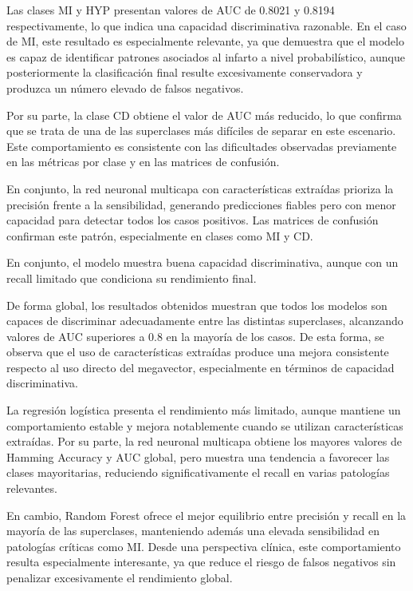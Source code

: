 \documentclass[12pt,a4paper,twoside]{book}
\begin{document}
Las clases MI y HYP presentan valores de AUC de 0.8021 y 0.8194 respectivamente, lo que indica una capacidad discriminativa razonable. 
En el caso de MI, este resultado es especialmente relevante, ya que demuestra que el modelo es capaz de identificar patrones asociados al infarto a nivel probabilístico, aunque posteriormente la clasificación final resulte excesivamente conservadora y produzca un número elevado de falsos negativos.

Por su parte, la clase CD obtiene el valor de AUC más reducido, lo que confirma que se trata de una de las superclases más difíciles de separar en este escenario. 
Este comportamiento es consistente con las dificultades observadas previamente en las métricas por clase y en las matrices de confusión.

\vspace{0.5cm}

En conjunto, la red neuronal multicapa con características extraídas prioriza la precisión frente a la sensibilidad, generando predicciones fiables pero con menor capacidad para detectar todos los casos positivos.
Las matrices de confusión confirman este patrón, especialmente en clases como MI y CD.

En conjunto, el modelo muestra buena capacidad discriminativa, aunque con un recall limitado que condiciona su rendimiento final.

\vspace{1cm}

De forma global, los resultados obtenidos muestran que todos los modelos son capaces de discriminar adecuadamente entre las distintas superclases, alcanzando valores de AUC superiores a 0.8 en la mayoría de los casos. 
De esta forma, se observa que el uso de características extraídas produce una mejora consistente respecto al uso directo del megavector, especialmente en términos de capacidad discriminativa.

La regresión logística presenta el rendimiento más limitado, aunque mantiene un comportamiento estable y mejora notablemente cuando se utilizan características extraídas. 
Por su parte, la red neuronal multicapa obtiene los mayores valores de Hamming Accuracy y AUC global, pero muestra una tendencia a favorecer las clases mayoritarias, reduciendo significativamente el recall en varias patologías relevantes.

En cambio, Random Forest ofrece el mejor equilibrio entre precisión y recall en la mayoría de las superclases, manteniendo además una elevada sensibilidad en patologías críticas como MI. 
Desde una perspectiva clínica, este comportamiento resulta especialmente interesante, ya que reduce el riesgo de falsos negativos sin penalizar excesivamente el rendimiento global.
\end{document}
